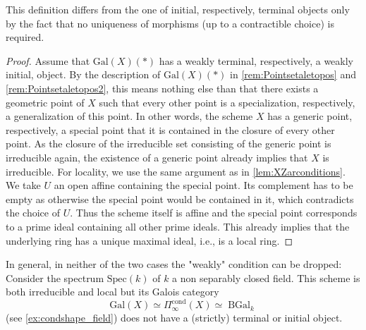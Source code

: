 \documentclass[leqno]{article}
\renewcommand{\Gal}{\mathrm{Gal}}
\newcommand{\cond}{\mathrm{cond}}
\DeclareMathOperator{\BGal}{BGal}
\newcommand{\Picond}{\Pi_{\infty}^{\cond}}
\newcommand{\CondShape}[1]{\Picond(#1)}
\renewcommand{\Spec}{\mathrm{Spec}}
\begin{document}
This definition differs from the one of initial, respectively, terminal objects only by the fact that no uniqueness of morphisms (up to a contractible choice) is required.
\begin{proof}
Assume that $\Gal(X)(\ast)$ has a weakly terminal, respectively, a weakly initial, object.
By the description of $\Gal(X)(\ast)$ in \cref{rem:Pointsetaletopos} and \cref{rem:Pointsetaletopos2}, this means nothing else than that there exists a geometric point of $X$ such that every other point is a specialization, respectively, a generalization of this point.
In other words, the scheme $X$ has a generic point, respectively, a special point that it is contained in the closure of every other point.
As the closure of the irreducible set consisting of the generic point is irreducible again, the existence of a generic point already implies that $X$ is irreducible.
For locality, we use the same argument as in  \cref{lem:XZarconditions}.
We take $U$ an open affine containing the special point.
Its complement has to be empty as otherwise the special point would be contained in it, which contradicts the choice of $U$.
Thus the scheme itself is affine and the special point corresponds to a prime ideal containing all other prime ideals.
This already implies that the underlying ring has a unique maximal ideal, i.e., is a local ring.
\end{proof}
%
\begin{example}
In general, in neither of the two cases the "weakly" condition can be dropped: Consider the spectrum $\Spec(k)$ of $k$ a non separably closed field.
This scheme is both irreducible and local but its Galois category $$\Gal(X)\simeq\CondShape{X}\simeq \BGal_k$$ (see \cref{ex:condshape_field}) does not have a (strictly) terminal or initial object.
\end{example}
\end{document}
